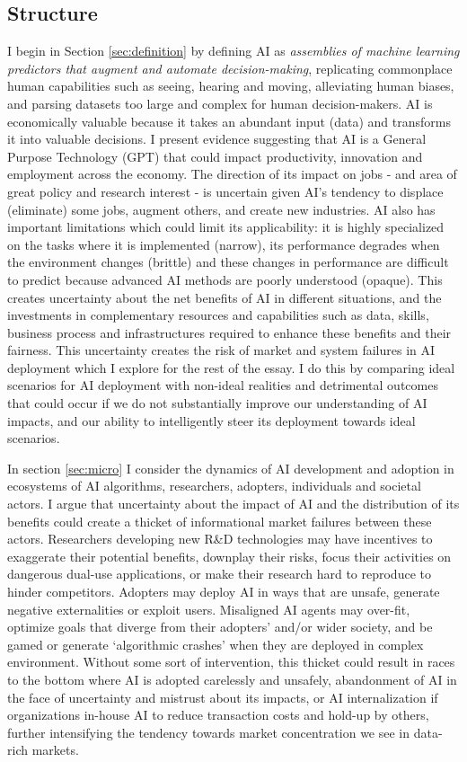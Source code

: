 \documentclass[11pt]{article}
\begin{document}
\subsection{Structure}
\label{subsec:structure}

 I begin in Section \ref{sec:definition} by defining AI as \textit{assemblies of machine learning predictors that augment and automate decision-making}, replicating commonplace human capabilities such as seeing, hearing and moving, alleviating human biases, and parsing datasets too large and complex for human decision-makers. AI is economically valuable because it takes an abundant input (data) and transforms it into valuable decisions. I present evidence suggesting that AI is a General Purpose Technology (GPT) that could impact productivity, innovation and employment across the economy. The direction of its impact on jobs - and area of great policy and research interest - is uncertain given AI's tendency to displace (eliminate) some jobs, augment others, and create new industries. AI also has important limitations which could limit its applicability: it is highly specialized on the tasks where it is implemented (narrow), its performance degrades when the environment changes (brittle) and these changes in performance are difficult to predict because advanced AI methods are poorly understood (opaque). This creates uncertainty about the net benefits of AI in different situations, and the investments in complementary resources and capabilities such as data, skills, business process and infrastructures  required to enhance these benefits and their fairness. This uncertainty creates the risk of market and system failures in AI deployment which I explore for the rest of the essay. I do this by comparing ideal scenarios for AI deployment with non-ideal realities and detrimental outcomes that could occur if we do not substantially improve our understanding of AI impacts, and our ability to intelligently steer its deployment towards ideal scenarios.
 
 In section \ref{sec:micro} I consider the dynamics of AI development and adoption in ecosystems of AI algorithms, researchers, adopters, individuals and societal actors. I argue that uncertainty about the impact of AI and the distribution of its benefits could create a thicket of informational market failures between these actors. Researchers developing new R\&D technologies may have incentives to exaggerate their potential benefits, downplay their risks, focus their activities on dangerous dual-use applications, or make their research hard to reproduce to hinder competitors. Adopters may deploy AI in ways that are unsafe, generate negative externalities or exploit users. Misaligned AI agents may over-fit, optimize goals that diverge from their adopters' and/or wider society, and be gamed or generate `algorithmic crashes' when they are deployed in complex environment. Without some sort of intervention, this thicket could result in races to the bottom where AI is adopted carelessly and unsafely, abandonment of AI in the face of uncertainty and mistrust about its impacts, or AI internalization if organizations in-house AI to reduce transaction costs and hold-up by others, further intensifying the tendency towards market concentration we see in data-rich markets. 
 
\end{document}
